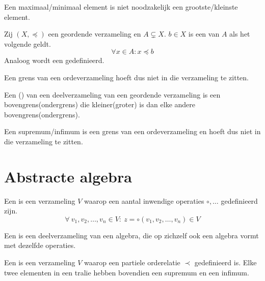\documentclass[main.tex]{subfiles}
\begin{document}
\begin{opm}
  Een maximaal/minimaal element is niet noodzakelijk een grootste/kleinste element.    
\end{opm}

\begin{de}
  Zij $(X,\preceq)$ een geordende verzameling en $A \subsetneq X$.
  $b \in X$ is een  van $A$ als het volgende geldt.
  \[ \forall x \in A: x \preceq b \]
  Analoog wordt een  gedefinieerd.
\end{de}

\begin{opm}
  Een grens van een ordeverzameling hoeft dus niet in die verzameling te zitten.
\end{opm}

\begin{de}
  Een () van een deelverzameling van een geordende verzameling is een bovengrens(ondergrens) die kleiner(groter) is dan elke andere bovengrens(ondergrens).
\end{de}

\begin{opm}
  Een supremum/infimum is een grens van een ordeverzameling en hoeft dus niet in die verzameling te zitten.
\end{opm}

\section{Abstracte algebra}
\label{sec:abstracte-algebra}

\begin{de}
  Een  is een verzameling $V$ waarop een aantal inwendige operaties $\circ,\ldots$ gedefinieerd zijn.
  \[ \forall\ v_1,v_2,\ldots,v_n \in V:\ z = \circ(v_1,v_2,\ldots,v_n) \in V \]
\end{de}

\begin{de}
  Een  is een deelverzameling van een algebra, die op zichzelf ook een algebra vormt met dezelfde operaties.
\end{de}

\begin{de}
  Een  is een verzameling $V$ waarop een partiele orderelatie $\prec$ gedefinieerd is.
  Elke twee elementen in een tralie hebben bovendien een supremum en een infimum.
\end{de}
\end{document}
